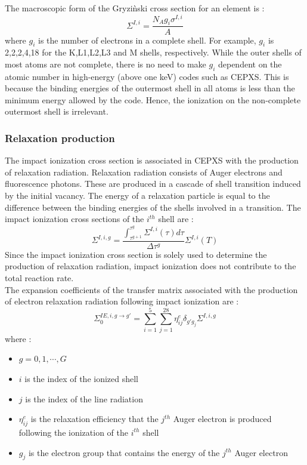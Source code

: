 The macroscopic form of the Gryzi\`nski cross section for an element is :
\begin{equation}
\Sigma^{I,i} = \frac{N_A g_i \sigma^{I,i}}{A}
\end{equation}
where $g_i$ is the number of electrons in a complete shell. For example, $g_i$
is 2,2,2,4,18 for the K,L1,L2,L3 and M shells, respectively. While the outer
shells of most atoms are not complete, there is no need to make $g_i$
dependent on the atomic number in high-energy (above one keV) codes such as
CEPXS. This is because the binding energies of the outermost shell in all
atoms is less than the minimum energy allowed by the code. Hence, the
ionization on the non-complete outermost shell is irrelevant.

\subsubsection{Relaxation production}
The impact ionization cross section is associated in CEPXS with the production
of relaxation radiation. Relaxation radiation consists of Auger electrons and
fluorescence photons. These are produced in a cascade of shell transition
induced by the initial vacancy. The energy of a relaxation particle is equal
to the difference between the binding energies of the shells involved in a
transition. The impact ionization cross sections of the $i^{th}$ shell are :
\begin{equation}
\Sigma^{I,i,g} = \frac{\int_{\tau^{g+1}}^{\tau^g}\Sigma^{I,i}(\tau)d\tau}{\Delta \tau^g} 
\Sigma^{I,i}(T)
\end{equation}
Since the impact ionization cross section is solely used to determine the
production of relaxation radiation, impact ionization does not contribute to
the total reaction rate.\\
The expansion coefficients of the transfer matrix associated with the
production of electron relaxation radiation following impact ionization are :
\begin{equation}
\Sigma_0^{IE,i,g\rightarrow g'} = \sum_{i=1}^5 \sum_{j=1}^28 \eta_{ij}^e
\delta_{g' g_j}\Sigma^{I,i,g}
\end{equation}
where :
\begin{itemize}
\item $g=0,1,\cdots,G$           
\item $i$ is the index of the ionized shell
\item $j$ is the index of the line radiation
\item $\eta_{ij}^e$ is the relaxation efficiency that the $j^{th}$ Auger
electron is produced following the ionization of the $i^{th}$ shell
\item $g_j$ is the electron group that contains the energy of the $j^{th}$
Auger electron
\end{itemize}
